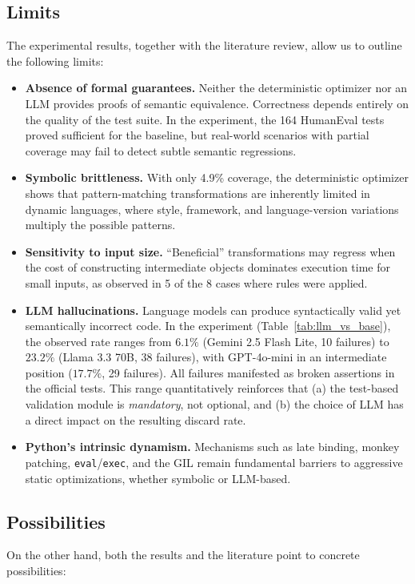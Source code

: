 \documentclass[conference]{IEEEtran}
\begin{document}
\subsection{Limits}
The experimental results, together with the literature review, allow us to outline the following limits:

\begin{itemize}
  \item \textbf{Absence of formal guarantees.} Neither the deterministic optimizer nor an LLM provides proofs of semantic equivalence. Correctness depends entirely on the quality of the test suite. In the experiment, the 164 HumanEval tests proved sufficient for the baseline, but real-world scenarios with partial coverage may fail to detect subtle semantic regressions.
  \item \textbf{Symbolic brittleness.} With only 4.9\% coverage, the deterministic optimizer shows that pattern-matching transformations are inherently limited in dynamic languages, where style, framework, and language-version variations multiply the possible patterns.
  \item \textbf{Sensitivity to input size.} ``Beneficial'' transformations may regress when the cost of constructing intermediate objects dominates execution time for small inputs, as observed in 5 of the 8 cases where rules were applied.
  \item \textbf{LLM hallucinations.} Language models can produce syntactically valid yet semantically incorrect code. In the experiment (Table~\ref{tab:llm_vs_base}), the observed rate ranges from $6.1\%$ (Gemini 2.5 Flash Lite, 10 failures) to $23.2\%$ (Llama 3.3 70B, 38 failures), with GPT-4o-mini in an intermediate position ($17.7\%$, 29 failures). All failures manifested as broken assertions in the official tests. This range quantitatively reinforces that (a) the test-based validation module is \emph{mandatory}, not optional, and (b) the choice of LLM has a direct impact on the resulting discard rate.
  \item \textbf{Python's intrinsic dynamism.} Mechanisms such as late binding, monkey patching, \texttt{eval}/\texttt{exec}, and the GIL remain fundamental barriers to aggressive static optimizations, whether symbolic or LLM-based.
\end{itemize}

\subsection{Possibilities}
On the other hand, both the results and the literature point to concrete possibilities:
\end{document}
